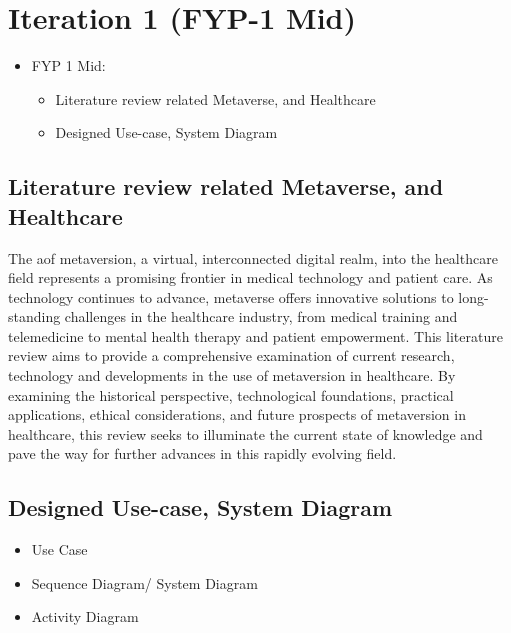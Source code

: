 \chapter{Iteration 1 (FYP-1 Mid)}
\label{ch:iter1}
\begin{itemize}
    \item FYP 1 Mid: 
    \begin{itemize}
    \item Literature review related Metaverse, and Healthcare
    \item Designed Use-case, System Diagram
    \end{itemize}
\end{itemize}


\section{Literature review related Metaverse, and Healthcare}
{The aof metaversion, a virtual, interconnected digital realm, into the healthcare field represents a promising frontier in medical technology and patient care. As technology continues to advance, metaverse offers innovative solutions to long-standing challenges in the healthcare industry, from medical training and telemedicine to mental health therapy and patient empowerment. This literature review aims to provide a comprehensive examination of current research, technology and developments in the use of metaversion in healthcare. By examining the historical perspective, technological foundations, practical applications, ethical considerations, and future prospects of metaversion in healthcare, this review seeks to illuminate the current state of knowledge and pave the way for further advances in this rapidly evolving field.
}

\section{Designed Use-case, System Diagram}
\begin{itemize}
    \item Use Case 
    \item Sequence Diagram/ System Diagram
    \item Activity Diagram
\end{itemize}



